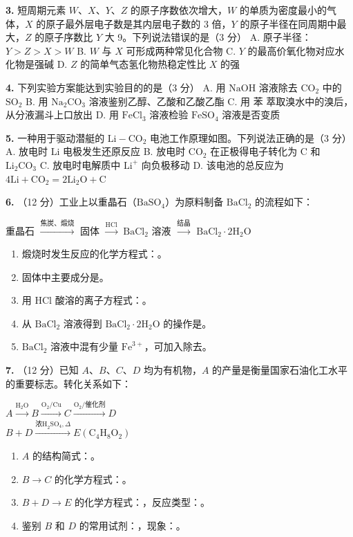 \textbf{3.} 短周期元素 $W$、$X$、$Y$、$Z$ 的原子序数依次增大，$W$ 的单质为密度最小的气体，$X$ 的原子最外层电子数是其内层电子数的 3 倍，$Y$ 的原子半径在同周期中最大，$Z$ 的原子序数比 $Y$ 大 9。下列说法错误的是（3 分）
A. 原子半径：$Y > Z > X > W$
B. $W$ 与 $X$ 可形成两种常见化合物
C. $Y$ 的最高价氧化物对应水化物是强碱
D. $Z$ 的简单气态氢化物热稳定性比 $X$ 的强

\textbf{4.} 下列实验方案能达到实验目的的是（3 分）
A. 用 $\text{NaOH}$ 溶液除去 $\text{CO}_2$ 中的 $\text{SO}_2$
B. 用 $\text{Na}_2\text{CO}_3$ 溶液鉴别乙醇、乙酸和乙酸乙酯
C. 用 $\text{苯}$ 萃取溴水中的溴后，从分液漏斗上口放出
D. 用 $\text{FeCl}_3$ 溶液检验 $\text{FeSO}_4$ 溶液是否变质

\textbf{5.} 一种用于驱动潜艇的 $\text{Li}-\text{CO}_2$ 电池工作原理如图。下列说法正确的是（3 分）
A. 放电时 $\text{Li}$ 电极发生还原反应
B. 放电时 $\text{CO}_2$ 在正极得电子转化为 $\text{C}$ 和 $\text{Li}_2\text{CO}_3$
C. 放电时电解质中 $\text{Li}^+$ 向负极移动
D. 该电池的总反应为 $4\text{Li} + \text{CO}_2 = 2\text{Li}_2\text{O} + \text{C}$

\textbf{6.} （12 分）工业上以重晶石（$\text{BaSO}_4$）为原料制备 $\text{BaCl}_2$ 的流程如下：

重晶石 $\xrightarrow{\text{焦炭、煅烧}}$ 固体 $\xrightarrow{\text{HCl}}$ $\text{BaCl}_2$ 溶液 $\xrightarrow{\text{结晶}}$ $\text{BaCl}_2\cdot2\text{H}_2\text{O}$

\begin{enumerate}
  \item 煅烧时发生反应的化学方程式：\underline{\qquad\qquad}。
  \item 固体中主要成分是\underline{\qquad\qquad}。
  \item 用 $\text{HCl}$ 酸溶的离子方程式：\underline{\qquad\qquad}。
  \item 从 $\text{BaCl}_2$ 溶液得到 $\text{BaCl}_2\cdot2\text{H}_2\text{O}$ 的操作是\underline{\qquad\qquad}。
  \item $\text{BaCl}_2$ 溶液中混有少量 $\text{Fe}^{3+}$，可加入\underline{\qquad\qquad}除去。
\end{enumerate}

\textbf{7.} （12 分）已知 $A$、$B$、$C$、$D$ 均为有机物，$A$ 的产量是衡量国家石油化工水平的重要标志。转化关系如下：

$A \xrightarrow{\text{H}_2\text{O}} B \xrightarrow{\text{O}_2/\text{Cu}} C \xrightarrow{\text{O}_2/\text{催化剂}} D$\\
$B + D \xrightarrow{\text{浓H}_2\text{SO}_4,\Delta} E(\text{C}_4\text{H}_8\text{O}_2)$

\begin{enumerate}
  \item $A$ 的结构简式：\underline{\qquad\qquad}。
  \item $B \to C$ 的化学方程式：\underline{\qquad\qquad}。
  \item $B + D \to E$ 的化学方程式：\underline{\qquad\qquad}，反应类型：\underline{\qquad\qquad}。
  \item 鉴别 $B$ 和 $D$ 的常用试剂：\underline{\qquad\qquad}，现象：\underline{\qquad\qquad}。
\end{enumerate}
